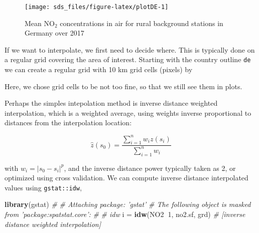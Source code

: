 \documentclass[]{book}
\newenvironment{Shaded}{\begin{snugshade}}{\end{snugshade}}
\newcommand{\CommentTok}[1]{\textcolor[rgb]{0.56,0.35,0.01}{\textit{#1}}}
\newcommand{\DataTypeTok}[1]{\textcolor[rgb]{0.13,0.29,0.53}{#1}}
\newcommand{\DecValTok}[1]{\textcolor[rgb]{0.00,0.00,0.81}{#1}}
\newcommand{\KeywordTok}[1]{\textcolor[rgb]{0.13,0.29,0.53}{\textbf{#1}}}
\newcommand{\NormalTok}[1]{#1}
\newcommand{\OperatorTok}[1]{\textcolor[rgb]{0.81,0.36,0.00}{\textbf{#1}}}
\newcommand{\StringTok}[1]{\textcolor[rgb]{0.31,0.60,0.02}{#1}}
\begin{document}
\begin{figure}

{\centering \texttt{[image: sds\_files/figure-latex/plotDE-1]} 

}

\caption{Mean NO\(_2\) concentrations in air for rural background stations in Germany over 2017}\label{fig:plotDE}
\end{figure}

If we want to interpolate, we first need to decide where. This
is typically done on a regular grid covering the area of
interest. Starting with the country outline \texttt{de} we can create a
regular grid with 10 km grid cells (pixels) by

\begin{Shaded}
\end{Shaded}

Here, we chose grid cells to be not too fine, so that we still see
them in plots.

Perhaps the simples intepolation method is inverse distance weighted
interpolation, which is a weighted average, using weights inverse
proportional to distances from the interpolation location:

\[
\hat{z}(s_0) = \frac{\sum_{i=1}^{n} w_i z(s_i)}{\sum_{i=1}^n w_i}
\]

with \(w_i = |s_0-s_i|^p\), and the inverse distance power typically
taken as 2, or optimized using cross validation. We can compute
inverse distance interpolated values using \texttt{gstat::idw},

\begin{Shaded}
\begin{Highlighting}[]
\KeywordTok{library}\NormalTok{(gstat)}
\CommentTok{# }
\CommentTok{# Attaching package: 'gstat'}
\CommentTok{# The following object is masked from 'package:spatstat.core':}
\CommentTok{# }
\CommentTok{#     idw}
\NormalTok{i =}\StringTok{ }\KeywordTok{idw}\NormalTok{(NO2}\OperatorTok{~}\DecValTok{1}\NormalTok{, no2.sf, grd)}
\CommentTok{# [inverse distance weighted interpolation]}
\end{Highlighting}
\end{Shaded}
\end{document}

